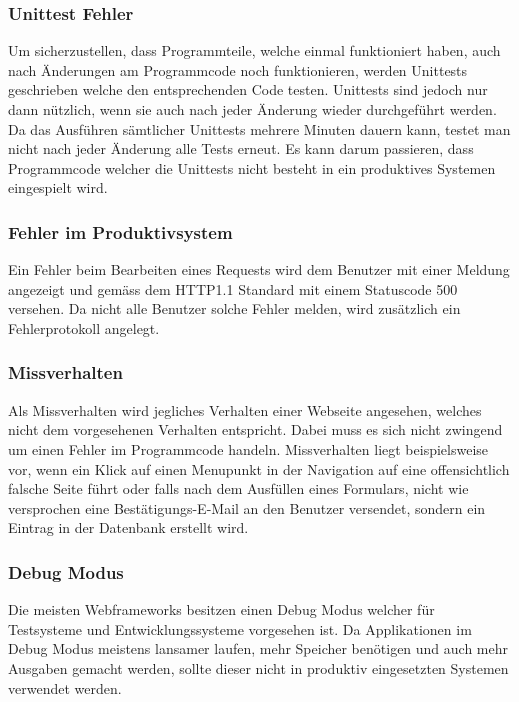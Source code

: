 \subsubsection{Unittest Fehler}
\label{ssub:unittestfehler}
Um sicherzustellen, dass Programmteile, welche einmal funktioniert haben, auch nach Änderungen am Programmcode noch funktionieren, werden Unittests geschrieben welche den entsprechenden Code testen. Unittests sind jedoch nur dann nützlich, wenn sie auch nach jeder Änderung wieder durchgeführt werden. Da das Ausführen sämtlicher Unittests mehrere Minuten dauern kann, testet man nicht nach jeder Änderung alle Tests erneut. Es kann darum passieren, dass Programmcode welcher die Unittests nicht besteht in ein produktives Systemen eingespielt wird.

\subsubsection{Fehler im Produktivsystem}
\label{ssub:fehlerimproduktivsystem}
Ein Fehler beim Bearbeiten eines Requests wird dem Benutzer mit einer Meldung angezeigt und gemäss dem HTTP1.1\cite{rfc2616} Standard mit einem Statuscode 500 versehen. Da nicht alle Benutzer solche Fehler melden, wird zusätzlich ein Fehlerprotokoll angelegt.

\subsubsection{Missverhalten}
\label{ssub:missverhalten}
Als Missverhalten wird jegliches Verhalten einer Webseite angesehen, welches nicht dem vorgesehenen Verhalten entspricht. Dabei muss es sich nicht zwingend um einen Fehler im Programmcode handeln. Missverhalten liegt beispielsweise vor, wenn ein Klick auf einen Menupunkt in der Navigation auf eine offensichtlich falsche Seite führt oder falls nach dem Ausfüllen eines Formulars, nicht wie versprochen eine Bestätigungs-E-Mail an den Benutzer versendet, sondern ein Eintrag in der Datenbank erstellt wird.

\subsubsection{Debug Modus}
\label{ssub:debugmodus}
Die meisten Webframeworks besitzen einen Debug Modus welcher für Testsysteme und Entwicklungssysteme vorgesehen ist. Da Applikationen im Debug Modus meistens lansamer laufen, mehr Speicher benötigen und auch mehr Ausgaben gemacht werden, sollte dieser nicht in produktiv eingesetzten Systemen verwendet werden.

